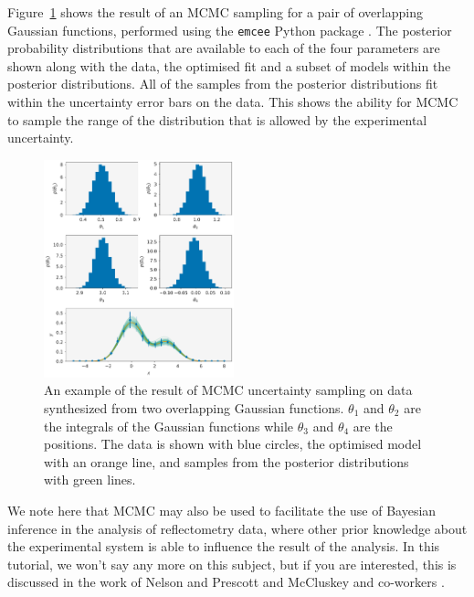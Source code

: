 \documentclass[
 reprint,
 superscriptaddress,
 amsmath,amssymb,
 aps,
]{revtex4-1}
\begin{document}
Figure~\ref{fig:mcmc} shows the result of an MCMC sampling for a pair of overlapping Gaussian functions, performed using the \texttt{emcee} Python package \cite{foremanmackey_emcee_2012}.
The posterior probability distributions that are available to each of the four parameters are shown along with the data, the optimised fit and a subset of models within the posterior distributions. 
All of the samples from the posterior distributions fit within the uncertainty error bars on the data.
This shows the ability for MCMC to sample the range of the distribution that is allowed by the experimental uncertainty. 
%
\begin{figure}[t]
    \includegraphics[width=0.49\textwidth]{mcmc}
    \caption{An example of the result of MCMC uncertainty sampling on data synthesized from two overlapping Gaussian functions. $\theta_1$ and $\theta_2$ are the integrals of the Gaussian functions while $\theta_3$ and $\theta_4$ are the positions. The data is shown with blue circles, the optimised model with an orange line, and samples from the posterior distributions with green lines.}
    \label{fig:mcmc}
\end{figure}
%

We note here that MCMC may also be used to facilitate the use of Bayesian inference in the analysis of reflectometry data, where other prior knowledge about the experimental system is able to influence the result of the analysis. 
In this tutorial, we won't say any more on this subject, but if you are interested, this is discussed in the work of Nelson and Prescott \cite{nelson_refnx_2019} and McCluskey and co-workers \cite{mccluskey_general_2020}. 
\end{document}
